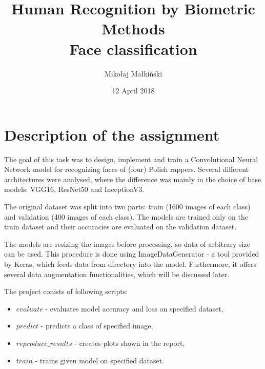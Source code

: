 \documentclass[a4paper,12pt]{article}
\title{
  \textbf{Human Recognition by Biometric Methods}\\
  \bigskip
  \textbf{Face classification}\\  
  \bigskip
}
\author{Mikołaj Małkiński}
\date{12 April 2018}
\begin{document}
\maketitle

\section{Description of the assignment}

The goal of this task was to design, implement and train a Convolutional Neural Network model for recognizing faces of (four) Polish rappers. Several different architectures were analysed, where the difference was mainly in the choice of base models: VGG16, ResNet50 and InceptionV3.
\par
The original dataset was split into two parts: train (1600 images of each class) and validation (400 images of each class). The models are trained only on the train dataset and their accuracies are evaluated on the validation dataset.
\par
The models are resizing the images before processing, so data of arbitrary size can be used. This procedure is done using ImageDataGenerator - a tool provided by Keras, which feeds data from directory into the model. Furthermore, it offers several data augmentation functionalities, which will be discussed later.
\par
The project conists of following scripts:
\begin{itemize}
\item $evaluate$ - evaluates model accuracy and loss on specified dataset,
\item $predict$ - predicts a class of specified image,
\item $reproduce\_results$ - creates plots shown in the report,
\item $train$ - trains given model on specified dataset.
\end{itemize}
\end{document}
